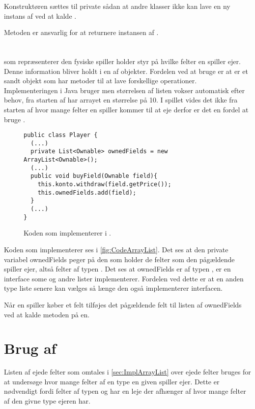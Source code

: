 Konstruktøren sættes til private sådan at andre klasser ikke kan lave en ny instans af  ved at kalde .

Metoden  er ansvarlig for at returnere instansen af .

\section{}\label{sec:ImplArrayList}
 som repræsenterer den fysiske spiller holder styr på hvilke felter en spiller ejer. Denne information bliver holdt i en  af  objekter. Fordelen ved at bruge  er at  er et sandt objekt som har metoder til at lave forskellige operationer. Implementeringen i Java bruger  men størrelsen af listen vokser automatisk efter behov, fra starten af har arrayet en størrelse på 10. I spillet vides det ikke fra starten af hvor mange felter en spiller kommer til at eje derfor er det en fordel at bruge .\cite{headfirstjava}

\begin{figure}
\caption{Koden som implementerer  i .}
\label{fig:CodeArrayList}
\centering
\begin{lstlisting}
public class Player {
  (...)
  private List<Ownable> ownedFields = new ArrayList<Ownable>();
  (...)
  public void buyField(Ownable field){
    this.konto.withdraw(field.getPrice());	
    this.ownedFields.add(field);
  }
  (...)
}
\end{lstlisting}
\end{figure}

Koden som implementerer  ses i \vref{fig:CodeArrayList}. Det ses at den private variabel ownedFields peger på den  som holder de felter som den pågældende spiller ejer, altså felter af typen . Det ses at ownedFields er af typen ,  er en interface some  og andre lister implementerer. Fordelen ved dette er at en anden type liste senere kan vælges så længe den også implementerer  interfacen.\cite{javaUtilList}

Når en spiller køber et felt tilføjes det pågældende felt til listen af ownedFields ved at kalde metoden  på en.



\section{Brug af }\label{sec:iterator}
Listen af ejede felter som omtales i \vref{sec:ImplArrayList} over ejede felter bruges for at undersøge hvor mange felter af en type en given spiller ejer. Dette er nødvendigt fordi felter af typen  og  har en leje der afhænger af hvor mange felter af den givne type ejeren har.

